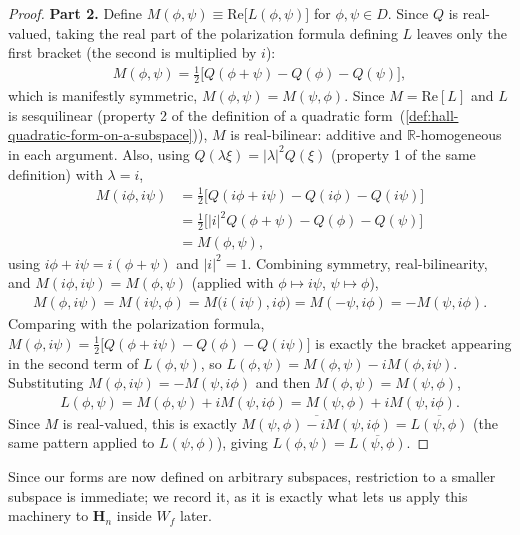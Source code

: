 \begin{proof}
\textbf{Part 2.} Define $M(\phi, \psi) \equiv \text{Re}\big[ L(\phi,\psi) \big]$ for $\phi, \psi \in D$. Since $Q$ is real-valued, taking the real part of the polarization formula defining $L$ leaves only the first bracket (the second is multiplied by $i$):
\begin{align}
    M(\phi, \psi) = \frac{1}{2}\big[ Q(\phi+\psi) - Q(\phi) - Q(\psi) \big],
\end{align}
which is manifestly symmetric, $M(\phi,\psi) = M(\psi,\phi)$. Since $M = \text{Re}[L]$ and $L$ is sesquilinear (property 2 of the definition of a quadratic form~(\ref{def:hall-quadratic-form-on-a-subspace})), $M$ is real-bilinear: additive and $\mathbb{R}$-homogeneous in each argument. Also, using $Q(\lambda\xi) = \lvert \lambda \rvert^2 Q(\xi)$ (property 1 of the same definition) with $\lambda = i$,
\begin{align}
    M(i\phi, i\psi) &= \frac{1}{2}\big[ Q(i\phi+i\psi) - Q(i\phi) - Q(i\psi) \big] \\
                &= \frac{1}{2}\big[ \lvert i \rvert^2 Q(\phi+\psi) - Q(\phi) - Q(\psi) \big] \\
                &= M(\phi, \psi),
\end{align}
using $i\phi + i\psi = i(\phi+\psi)$ and $\lvert i \rvert^2 = 1$. Combining symmetry, real-bilinearity, and $M(i\phi,i\psi) = M(\phi,\psi)$ (applied with $\phi \mapsto i\psi$, $\psi \mapsto \phi$),
\begin{align}
    M(\phi, i\psi) = M(i\psi, \phi) = M\big( i(i\psi), i\phi \big) = M(-\psi, i\phi) = -M(\psi, i\phi).
\end{align}
Comparing with the polarization formula, $M(\phi,i\psi) = \tfrac{1}{2}\big[ Q(\phi+i\psi) - Q(\phi) - Q(i\psi) \big]$ is exactly the bracket appearing in the second term of $L(\phi,\psi)$, so $L(\phi,\psi) = M(\phi,\psi) - iM(\phi,i\psi)$. Substituting $M(\phi,i\psi) = -M(\psi,i\phi)$ and then $M(\phi,\psi) = M(\psi,\phi)$,
\begin{align}
    L(\phi,\psi) = M(\phi,\psi) + iM(\psi,i\phi) = M(\psi,\phi) + iM(\psi,i\phi).
\end{align}
Since $M$ is real-valued, this is exactly $\overline{M(\psi,\phi) - iM(\psi,i\phi)} = \overline{L(\psi,\phi)}$ (the same pattern applied to $L(\psi,\phi)$), giving $L(\phi,\psi) = \overline{L(\psi,\phi)}$.
\end{proof}

Since our forms are now defined on arbitrary subspaces, restriction to a smaller subspace is immediate; we record it, as it is exactly what lets us apply this machinery to $\mathbf{H}_n$ inside $W_f$ later.

